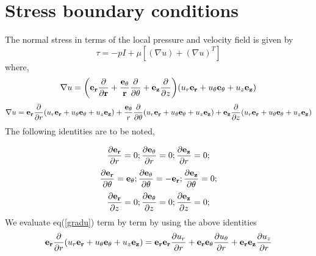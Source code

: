\documentclass{article}
\begin{document}
\section{Stress boundary conditions}
The normal stress in terms of the local pressure and velocity field is given by 
\begin{equation}
\label{tau}
\tau = -pI + \mu[(\nabla u)+ (\nabla u)^T]
\end{equation}
where,
\begin{equation}
\nabla u = \bigg({\bf e_{r}\frac{\partial}{\partial r} + \frac{{\bf e_{\theta}}}{r}\frac{\partial }{\partial \theta } + {\bf e_{z}}}\frac{\partial}{\partial z}\bigg)(u_{r}{\bf e_{r}} + u_{\theta}{\bf e_{\theta}} + u_{z}{\bf e_{z}}) 
\end{equation}
\begin{equation}
\label{gradu}
\nabla u = {\bf e_{r}}\frac{\partial}{\partial r} (u_{r}{\bf e_{r}} + u_{\theta}{\bf e_{\theta}} + u_{z}{\bf e_{z}}) + \frac{{\bf e_{\theta}}}{r}\frac{\partial}{\partial \theta} (u_{r}{\bf e_{r}} + u_{\theta}{\bf e_{\theta}} + u_{z}{\bf e_{z}}) 
+ {\bf e_{z}}\frac{\partial}{\partial z} (u_{r}{\bf e_{r}} + u_{\theta}{\bf e_{\theta}} + u_{z}{\bf e_{z}})
\end{equation}
The following identities are to be noted, 

\begin{equation*}
\frac{\partial {\bf e_{r}}}{\partial r} = 0;  \frac{\partial {\bf e_{\theta}}}{\partial r} = 0; \frac{\partial {\bf e_{z}}}{\partial r} =0;
\end{equation*}
\begin{equation*}
\frac{\partial {\bf e_{r}}}{\partial \theta} ={\bf e_{\theta}}; \frac{\partial {\bf e_{\theta}}}{\partial \theta} = -{\bf e_{r}};    
\frac{\partial {\bf e_{z}}}{\partial \theta} = 0;
\end{equation*}
\begin{equation*}
\frac{\partial {\bf e_{r}}}{\partial z} = 0;  \frac{\partial {\bf e_{\theta}}}{\partial z} = 0; \frac{\partial {\bf e_{z}}}{\partial z} =0;
\end{equation*}  
We evaluate eq(\ref{gradu}) term by term by using the above identities
\begin{equation}
{\bf e_{r}}\frac{\partial}{\partial r} (u_{r}{\bf e_{r}} + u_{\theta}{\bf e_{\theta}} + u_{z}{\bf e_{z}}) = {\bf e_{r}}{\bf e_{r}}
\frac{\partial u_{r}}{\partial r} + {\bf e_{r}}{\bf e_{\theta}}\frac{\partial u_{\theta}}{\partial r} + {\bf e_{r}}{\bf e_{z}}
\frac{\partial u_{z}}{\partial r}
\end{equation}
\end{document}
